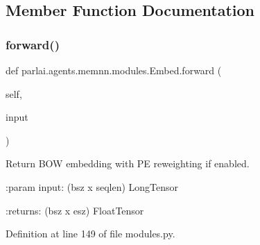 \subsection{Member Function Documentation}
\mbox{\label{classparlai_1_1agents_1_1memnn_1_1modules_1_1Embed_a03a7701e101296fbbf28dcc05039c248}} 
\subsubsection{\texorpdfstring{forward()}{forward()}}
{\footnotesize\ttfamily def parlai.\+agents.\+memnn.\+modules.\+Embed.\+forward (\begin{DoxyParamCaption}\item[{}]{self,  }\item[{}]{input }\end{DoxyParamCaption})}

\begin{DoxyVerb}Return BOW embedding with PE reweighting if enabled.

:param input:
    (bsz x seqlen) LongTensor

:returns:
    (bsz x esz) FloatTensor
\end{DoxyVerb}
 

Definition at line 149 of file modules.\+py.


